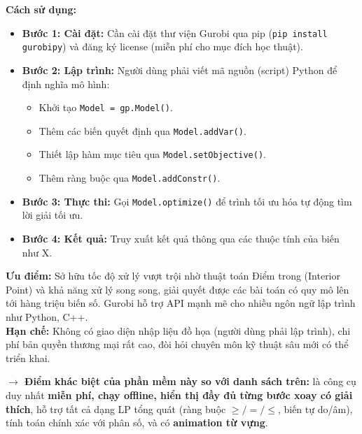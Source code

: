 \documentclass[12pt,a4paper]{article}
\begin{document}
\medskip
\noindent\textbf{Cách sử dụng:}
\begin{itemize}[label=\textcolor{secondary}{$\circ$}]
    \item \textbf{Bước 1: Cài đặt:} Cần cài đặt thư viện Gurobi qua pip (\texttt{pip install gurobipy}) và đăng ký license (miễn phí cho mục đích học thuật).
    \item \textbf{Bước 2: Lập trình:} Người dùng phải viết mã nguồn (script) Python để định nghĩa mô hình:
    \begin{itemize}
        \item Khởi tạo \texttt{Model = gp.Model()}.
        \item Thêm các biến quyết định qua \texttt{Model.addVar()}.
        \item Thiết lập hàm mục tiêu qua \texttt{Model.setObjective()}.
        \item Thêm ràng buộc qua \texttt{Model.addConstr()}.
    \end{itemize}
    \item \textbf{Bước 3: Thực thi:} Gọi \texttt{Model.optimize()} để trình tối ưu hóa tự động tìm lời giải tối ưu.
    \item \textbf{Bước 4: Kết quả:} Truy xuất kết quả thông qua các thuộc tính của biến như X.
\end{itemize}
\textbf{Ưu điểm:} Sở hữu tốc độ xử lý vượt trội nhờ thuật toán Điểm trong (Interior Point) và khả năng xử lý song song, giải quyết được các bài toán có quy mô lên tới hàng triệu biến số. Gurobi hỗ trợ API mạnh mẽ cho nhiều ngôn ngữ lập trình như Python, C++.\\
\textbf{Hạn chế:} Không có giao diện nhập liệu đồ họa (người dùng phải lập trình), chi phí bản quyền thương mại rất cao, đòi hỏi chuyên môn kỹ thuật sâu mới có thể triển khai.

\vspace{0.5cm}
\begin{mdframed}[linecolor=secondary, linewidth=1.5pt, roundcorner=5pt, backgroundcolor=green!5]
    \textbf{$\rightarrow$ Điểm khác biệt của phần mềm này so với danh sách trên:} là công cụ duy nhất \textbf{miễn phí, chạy offline, hiển thị đầy đủ từng bước xoay có giải thích}, hỗ trợ tất cả dạng LP tổng quát (ràng buộc $\geq/=/\leq$, biến tự do/âm), tính toán chính xác với phân số, và có \textbf{animation từ vựng}.
\end{mdframed}

\newpage
{}
\end{document}
